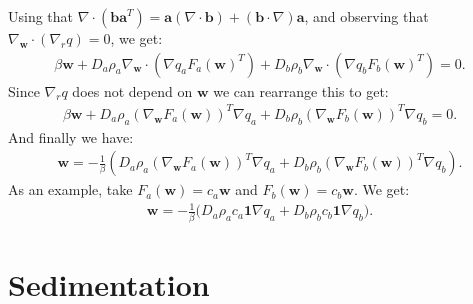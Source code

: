 \documentclass[11pt, a4paper]{article}
\theoremstyle{definition}
\newcommand{\adja}{q_a}
\newcommand{\adjb}{q_b}
\newcommand{\ra}{\rho_a}
\newcommand{\rb}{\rho_b}
\newcommand{\w}{\mathbf{w}}
\begin{document}
Using that $\nabla \cdot (\mathbf{b a}^T) = \mathbf a (\nabla \cdot \mathbf b) + (\mathbf b \cdot \nabla) \mathbf a$, and observing that $\nabla_{\w} \cdot (\nabla_r q) = 0$, we get:
\begin{align*}
\beta \w  + D_a \ra \nabla_{\w} \cdot \left(\nabla \adja F_a(\w)^T \right) 
+ D_b \rb \nabla_{\w} \cdot \left(\nabla \adjb F_b(\w)^T \right) = 0.
\end{align*} 
Since $\nabla_r q$ does not depend on $\w$ we can rearrange this to get:
\begin{align*}
\beta \w  + D_a \ra \left(\nabla_\w F_a(\w)\right)^T \nabla \adja  
+ D_b \rb \left(\nabla_\w F_b(\w)\right)^T \nabla \adjb = 0.
\end{align*}
And finally we have:
\begin{align*}
\w = - \frac{1}{\beta} \left( D_a \ra \left(\nabla_\w F_a(\w)\right)^T \nabla \adja  
+ D_b \rb \left(\nabla_\w F_b(\w)\right)^T \nabla \adjb \right).
\end{align*}
As an example, take $F_a(\w) = c_a \w$ and $F_b(\w) = c_b \w$. We get:
\begin{align*}
\w  = - \frac{1}{\beta}\bigg( D_a  \ra c_a \mathbf 1 \nabla \adja + D_b \rb c_b \mathbf 1 \nabla \adjb \bigg).
\end{align*}









	
\section{Sedimentation}	
\end{document}
